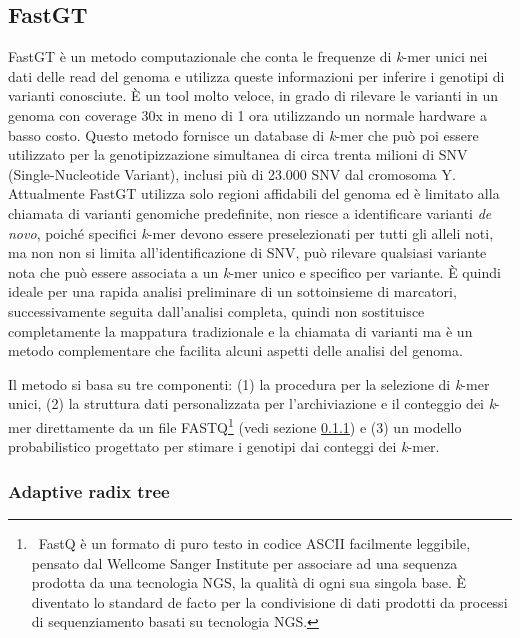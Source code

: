 \documentclass[../main.tex]{subfiles}
\begin{document}
\subsection{FastGT}
\label{fastgt}

FastGT \cite{pajuste2017fastgt} è un metodo computazionale che conta le frequenze di \textit{k}-mer unici nei dati delle read del genoma e utilizza queste informazioni per inferire i genotipi di varianti conosciute. È un tool molto veloce, in grado di rilevare le varianti in un genoma con coverage 30x in meno di 1 ora utilizzando un normale hardware a basso costo. Questo metodo fornisce un database di \textit{k}-mer che può poi essere utilizzato per la genotipizzazione simultanea di circa trenta milioni di SNV (Single-Nucleotide Variant), inclusi più di 23.000 SNV dal cromosoma Y. Attualmente FastGT utilizza solo regioni affidabili del genoma ed è limitato alla chiamata di varianti genomiche predefinite, non riesce a identificare varianti \textit{de novo}, poiché specifici \textit{k}-mer devono essere preselezionati per tutti gli alleli noti, ma non non si limita all'identificazione di SNV, può rilevare qualsiasi variante nota che può essere associata a un \textit{k}-mer unico e specifico per variante. È quindi ideale per una rapida analisi preliminare di un sottoinsieme di marcatori, successivamente seguita dall'analisi completa, quindi non sostituisce completamente la mappatura tradizionale e la chiamata di varianti ma è un metodo complementare che facilita alcuni aspetti delle analisi del genoma.

Il metodo si basa su tre componenti: (1) la procedura per la selezione di \textit{k}-mer unici, (2) la struttura dati personalizzata per l'archiviazione e il conteggio dei \textit{k}-mer direttamente da un file FASTQ\footnote{\ FastQ è un formato di puro testo in codice ASCII facilmente leggibile, pensato dal Wellcome Sanger Institute per associare ad una sequenza prodotta da una tecnologia NGS, la qualità di ogni sua singola base. È diventato lo standard de facto per la condivisione di dati \cite{cock2010sanger} \label{nota:FASTQ} prodotti da processi di sequenziamento basati su tecnologia NGS.} (vedi sezione \ref{AdaptiveRadixTree}) e (3) un modello probabilistico progettato per stimare i genotipi dai conteggi dei \textit{k}-mer.

\subsubsection{Adaptive radix tree}
\label{AdaptiveRadixTree}
\end{document}
